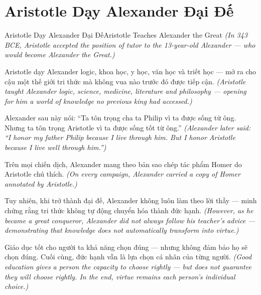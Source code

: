 \section{Aristotle Dạy Alexander Đại Đế}
\begin{truyen}{Aristotle Dạy Alexander Đại Đế}{Aristotle Teaches Alexander the Great}
\textit{(In 343 BCE, Aristotle accepted the position of tutor to the 13-year-old Alexander — who would become Alexander the Great.)}

Aristotle dạy Alexander logic, khoa học, y học, văn học và triết học — mở ra cho cậu một thế giới tri thức mà không vua nào trước đó được tiếp cận.
\textit{(Aristotle taught Alexander logic, science, medicine, literature and philosophy — opening for him a world of knowledge no previous king had accessed.)}

Alexander sau này nói: ``Ta tôn trọng cha ta Philip vì ta được sống từ ông. Nhưng ta tôn trọng Aristotle vì ta được sống tốt từ ông.''
\textit{(Alexander later said: ``I honor my father Philip because I live through him. But I honor Aristotle because I live well through him.'')}

Trên mọi chiến dịch, Alexander mang theo bản sao chép tác phẩm Homer do Aristotle chú thích.
\textit{(On every campaign, Alexander carried a copy of Homer annotated by Aristotle.)}

Tuy nhiên, khi trở thành đại đế, Alexander không luôn làm theo lời thầy — minh chứng rằng tri thức không tự động chuyển hóa thành đức hạnh.
\textit{(However, as he became a great conqueror, Alexander did not always follow his teacher's advice — demonstrating that knowledge does not automatically transform into virtue.)}

\end{truyen}

\begin{baihoc}
Giáo dục tốt cho người ta khả năng chọn đúng — nhưng không đảm bảo họ sẽ chọn đúng. Cuối cùng, đức hạnh vẫn là lựa chọn cá nhân của từng người.
\textit{(Good education gives a person the capacity to choose rightly — but does not guarantee they will choose rightly. In the end, virtue remains each person's individual choice.)}
\end{baihoc}
\ngancach

